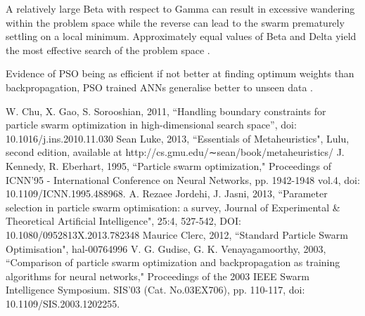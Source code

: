 \documentclass[12pt]{article}
\begin{document}
A relatively large Beta with respect to Gamma can result in excessive wandering within the problem space while the reverse  can lead to the swarm prematurely settling on a local minimum. Approximately equal values of Beta and Delta yield the most effective search of the problem space \cite{Kennedy}.

Evidence of PSO being as efficient if not better at finding optimum weights than backpropagation, PSO trained ANNs generalise better to unseen data \cite{Kennedy}.


\vspace{-1.5em}
\begin{thebibliography}{10}

 W. Chu, X. Gao, S. Sorooshian, 2011, ``Handling boundary constraints for particle swarm optimization in high-dimensional search space'', doi: 10.1016/j.ins.2010.11.030
 Sean Luke, 2013, ``Essentials of Metaheuristics", Lulu, second edition, available at http://cs.gmu.edu/∼sean/book/metaheuristics/
 J. Kennedy, R. Eberhart, 1995, ``Particle swarm optimization," Proceedings of ICNN'95 - International Conference on Neural Networks,  pp. 1942-1948 vol.4, doi: 10.1109/ICNN.1995.488968.
 A. Rezaee Jordehi, J. Jasni, 2013, ``Parameter selection in particle swarm optimisation: a survey, Journal of Experimental \& Theoretical Artificial Intelligence", 25:4, 527-542, DOI: 10.1080/0952813X.2013.782348
 Maurice Clerc, 2012, ``Standard Particle Swarm Optimisation", hal-00764996
  V. G. Gudise, G. K. Venayagamoorthy, 2003, ``Comparison of particle swarm optimization and backpropagation as training algorithms for neural networks," Proceedings of the 2003 IEEE Swarm Intelligence Symposium. SIS'03 (Cat. No.03EX706), pp. 110-117, doi: 10.1109/SIS.2003.1202255.


\end{thebibliography}
\end{document}

